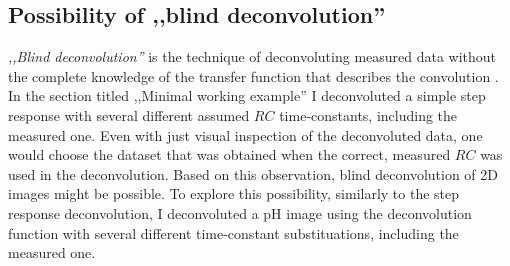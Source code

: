\subsection{Possibility of ,,blind deconvolution''}
\emph{,,Blind deconvolution''} is the technique of deconvoluting measured data without the complete knowledge of the transfer function that describes the convolution \cite{lam2000iterative}.
In the section titled ,,Minimal working example'' I deconvoluted a simple step response with several different assumed $RC$ time-constants, including the measured one.
Even with just visual inspection of the deconvoluted data, one would choose the dataset that was obtained when the correct, measured $RC$ was used in the deconvolution.
Based on this observation, blind deconvolution of 2D images might be possible.
To explore this possibility, similarly to the step response deconvolution, I deconvoluted a pH image using the deconvolution function with several different time-constant substituations, including the measured one.

